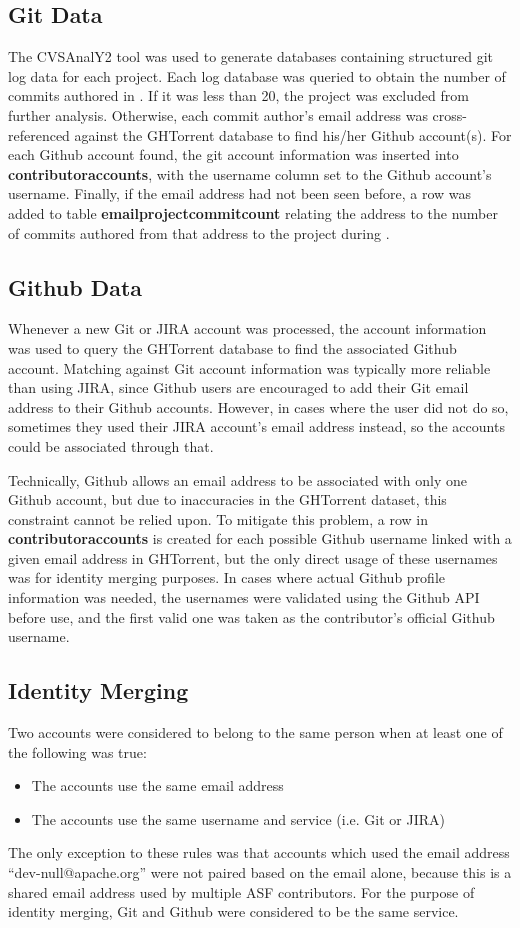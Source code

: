 \subsection{Git Data}\label{gitsec}
The CVSAnalY2 tool was used to generate databases containing structured git log data for each project. Each log database was queried to obtain the number of commits authored in \timeperiod. If it was less than 20, the project was excluded from further analysis. Otherwise, each commit author's email address was cross-referenced against the GHTorrent database to find his/her Github account(s). For each Github account found, the git account information was inserted into \textbf{contributoraccounts}, with the username column set to the Github account's username. Finally, if the email address had not been seen before, a row was added to table \textbf{emailprojectcommitcount} relating the address to the number of commits authored from that address to the project during \timeperiod.
\subsection{Github Data}\label{githubsec}
Whenever a new Git or JIRA account was processed, the account information was used to query the GHTorrent database to find the associated Github account. Matching against Git account information was typically more reliable than using JIRA, since Github users are encouraged to add their Git email address to their Github accounts. However, in cases where the user did not do so, sometimes they used their JIRA account's email address instead, so the accounts could be associated through that.

Technically, Github allows an email address to be associated with only one Github account, but due to inaccuracies in the GHTorrent dataset, this constraint cannot be relied upon. To mitigate this problem, a row in \textbf{contributoraccounts} is created for each possible Github username linked with a given email address in GHTorrent, but the only direct usage of these usernames was for identity merging purposes. In cases where actual Github profile information was needed, the usernames were validated using the Github API before use, and the first valid one was taken as the contributor's official Github username.
\subsection{Identity Merging}\label{mergingsec}
Two accounts were considered to belong to the same person when at least one of the following was true:
\begin{itemize}
	\item The accounts use the same email address
	\item The accounts use the same username and service (i.e. Git or JIRA)
\end{itemize}
The only exception to these rules was that accounts which used the email address ``dev-null@apache.org'' were not paired based on the email alone, because this is a shared email address used by multiple ASF contributors. For the purpose of identity merging, Git and Github were considered to be the same service.

